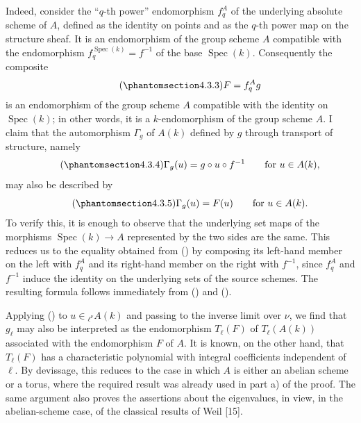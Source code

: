 Indeed, consider the ``$q$-th power'' endomorphism $f_q^A$ of the
underlying absolute scheme of $A$, defined as the identity on points and
as the $q$-th power map on the structure sheaf.  It is an endomorphism of
the group scheme $A$ compatible with the endomorphism
$f_q^{\operatorname{Spec}(k)}=f^{-1}$ of the base
$\operatorname{Spec}(k)$.  Consequently the composite
\begin{equation}\tag{\SGARefTarget{sga7.sga7i.eix.n4-3-3}{4.3.3}}
 F=f_q^A g
\end{equation}
is an endomorphism of the group scheme $A$ compatible with the identity
on $\operatorname{Spec}(k)$; in other words, it is a $k$-endomorphism of
the group scheme $A$.  I claim that the automorphism $\Gamma_g$ of $A(k)$
defined by $g$ through transport of structure, namely
\begin{equation}\tag{\SGARefTarget{sga7.sga7i.eix.n4-3-4}{4.3.4}}
 \Gamma_g(u)=g\circ u\circ f^{-1}
 \qquad\text{for }u\in A(k),
\end{equation}
may also be described by
\begin{equation}\tag{\SGARefTarget{sga7.sga7i.eix.n4-3-5}{4.3.5}}
 \Gamma_g(u)=F(u)
 \qquad\text{for }u\in A(k).
\end{equation}
To verify this, it is enough to observe that the underlying set maps of
the morphisms $\operatorname{Spec}(k)\longrightarrow A$ represented by
the two sides are the same.  This reduces us to the equality obtained
from () by composing its left-hand member on the left with $f_q^A$
and its right-hand member on the right with $f^{-1}$, since $f_q^A$ and
$f^{-1}$ induce the identity on the underlying sets of the source
schemes.  The resulting formula follows immediately from () and
().

Applying () to $u\in{}_{\ell^\nu}A(k)$ and passing to the inverse
limit over $\nu$, we find that $g_\ell$ may also be interpreted as the
endomorphism $T_\ell(F)$ of $T_\ell(A(k))$ associated with the
endomorphism $F$ of $A$.  It is known, on the other hand, that
$T_\ell(F)$ has a characteristic polynomial with integral coefficients
independent of $\ell$.  By devissage, this reduces to the case in which
$A$ is either an abelian scheme or a torus, where the required result was
already used in part a) of the proof.  The same argument also proves the
assertions about the eigenvalues, in view, in the abelian-scheme case, of
the classical results of Weil [15].

